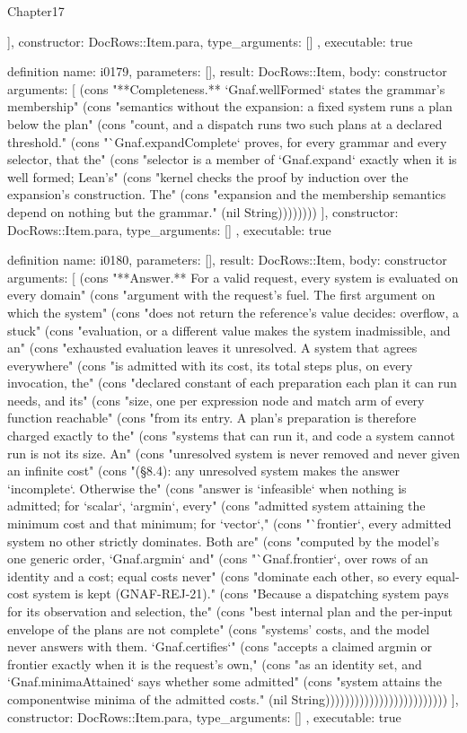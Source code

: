 \begin{lexlean}{Chapter17}
\begin{semanticmodule}
{{    ],
    constructor: DocRows::Item.para,
    type_arguments: []
  },
  executable: true
}

definition{
  name: i0179,
  parameters: [],
  result: DocRows::Item,
  body: constructor{
    arguments: [
      (cons "**Completeness.** `Gnaf.wellFormed` states the grammar's membership" (cons "semantics without the expansion: a fixed system runs a plan below the plan" (cons "count, and a dispatch runs two such plans at a declared threshold." (cons "`Gnaf.expandComplete` proves, for every grammar and every selector, that the" (cons "selector is a member of `Gnaf.expand` exactly when it is well formed; Lean's" (cons "kernel checks the proof by induction over the expansion's construction. The" (cons "expansion and the membership semantics depend on nothing but the grammar." (nil String))))))))
    ],
    constructor: DocRows::Item.para,
    type_arguments: []
  },
  executable: true
}

definition{
  name: i0180,
  parameters: [],
  result: DocRows::Item,
  body: constructor{
    arguments: [
      (cons "**Answer.** For a valid request, every system is evaluated on every domain" (cons "argument with the request's fuel. The first argument on which the system" (cons "does not return the reference's value decides: overflow, a stuck" (cons "evaluation, or a different value makes the system inadmissible, and an" (cons "exhausted evaluation leaves it unresolved. A system that agrees everywhere" (cons "is admitted with its cost, its total steps plus, on every invocation, the" (cons "declared constant of each preparation each plan it can run needs, and its" (cons "size, one per expression node and match arm of every function reachable" (cons "from its entry. A plan's preparation is therefore charged exactly to the" (cons "systems that can run it, and code a system cannot run is not its size. An" (cons "unresolved system is never removed and never given an infinite cost" (cons "(§8.4): any unresolved system makes the answer `incomplete`. Otherwise the" (cons "answer is `infeasible` when nothing is admitted; for `scalar`, `argmin`, every" (cons "admitted system attaining the minimum cost and that minimum; for `vector`," (cons "`frontier`, every admitted system no other strictly dominates. Both are" (cons "computed by the model's one generic order, `Gnaf.argmin` and" (cons "`Gnaf.frontier`, over rows of an identity and a cost; equal costs never" (cons "dominate each other, so every equal-cost system is kept (GNAF-REJ-21)." (cons "Because a dispatching system pays for its observation and selection, the" (cons "best internal plan and the per-input envelope of the plans are not complete" (cons "systems' costs, and the model never answers with them. `Gnaf.certifies`" (cons "accepts a claimed argmin or frontier exactly when it is the request's own," (cons "as an identity set, and `Gnaf.minimaAttained` says whether some admitted" (cons "system attains the componentwise minima of the admitted costs." (nil String)))))))))))))))))))))))))
    ],
    constructor: DocRows::Item.para,
    type_arguments: []
  },
  executable: true
}


\end{semanticmodule}
\end{lexlean}
